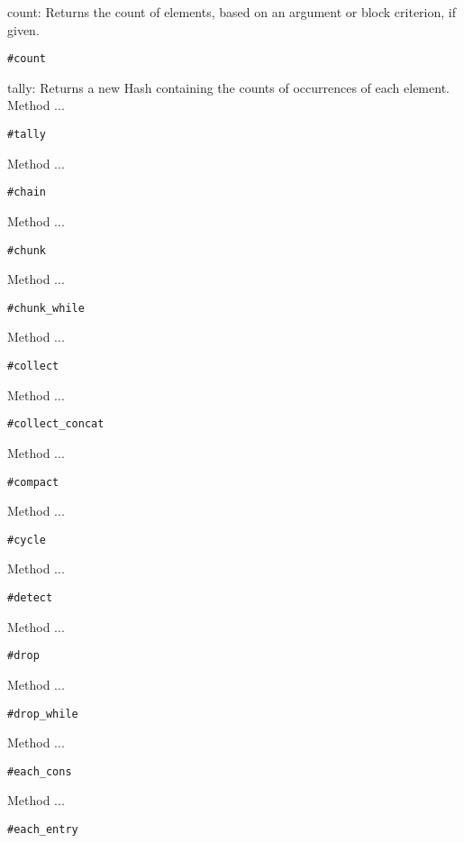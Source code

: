 count: Returns the count of elements, based on an argument or block criterion, if given.
\begin{verbatim}
#count
\end{verbatim}

tally: Returns a new Hash containing the counts of occurrences of each element.
Method ...
\begin{verbatim}
#tally
\end{verbatim}

Method ...
\begin{verbatim}
#chain
\end{verbatim}

Method ...
\begin{verbatim}
#chunk
\end{verbatim}

Method ...
\begin{verbatim}
#chunk_while
\end{verbatim}

Method ...
\begin{verbatim}
#collect
\end{verbatim}

Method ...
\begin{verbatim}
#collect_concat
\end{verbatim}

Method ...
\begin{verbatim}
#compact
\end{verbatim}



Method ...
\begin{verbatim}
#cycle
\end{verbatim}

Method ...
\begin{verbatim}
#detect
\end{verbatim}

Method ...
\begin{verbatim}
#drop
\end{verbatim}

Method ...
\begin{verbatim}
#drop_while
\end{verbatim}

Method ...
\begin{verbatim}
#each_cons
\end{verbatim}

Method ...
\begin{verbatim}
#each_entry
\end{verbatim}

